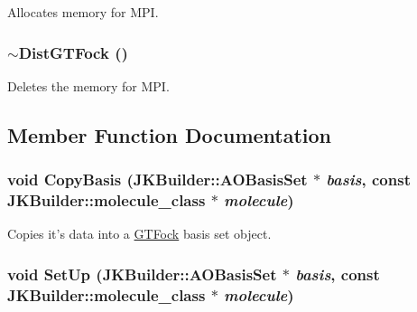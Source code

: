 Allocates memory for MPI. \hypertarget{classGTFock_1_1DistGTFock_aacafefb187ed3acf152e0b2f75cca49b}{
\subsubsection[{$\sim$DistGTFock}]{\setlength{\rightskip}{0pt plus 5cm}$\sim${\bf DistGTFock} ()}}
\label{classGTFock_1_1DistGTFock_aacafefb187ed3acf152e0b2f75cca49b}


Deletes the memory for MPI. 

\subsection{Member Function Documentation}
\hypertarget{classGTFock_1_1DistGTFock_af1268d1c5fac4a061b995c267bf9f219}{
\subsubsection[{CopyBasis}]{\setlength{\rightskip}{0pt plus 5cm}void CopyBasis ({\bf JKBuilder::AOBasisSet} $\ast$ {\em basis}, \/  const {\bf JKBuilder::molecule\_\-class} $\ast$ {\em molecule})}}
\label{classGTFock_1_1DistGTFock_af1268d1c5fac4a061b995c267bf9f219}


Copies it's data into a \hyperlink{namespaceGTFock}{GTFock} basis set object. \hypertarget{classGTFock_1_1DistGTFock_a0da100e6aeb49168e1c88c7cfae6e976}{
\subsubsection[{SetUp}]{\setlength{\rightskip}{0pt plus 5cm}void SetUp ({\bf JKBuilder::AOBasisSet} $\ast$ {\em basis}, \/  const {\bf JKBuilder::molecule\_\-class} $\ast$ {\em molecule})}}
\label{classGTFock_1_1DistGTFock_a0da100e6aeb49168e1c88c7cfae6e976}


